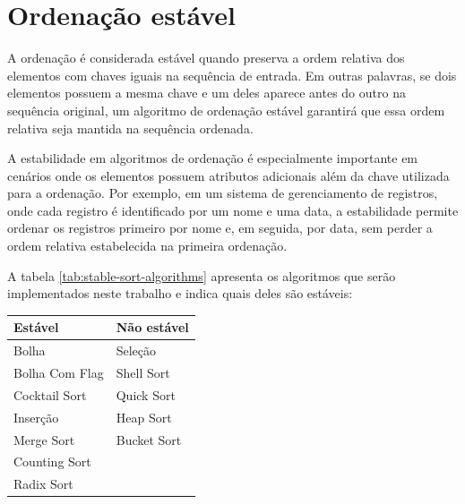 \section{Ordenação estável}
A ordenação é considerada estável quando preserva a ordem relativa dos elementos com chaves iguais na sequência de entrada. Em outras palavras, se dois elementos possuem a mesma chave e um deles aparece antes do outro na sequência original, um algoritmo de ordenação estável garantirá que essa ordem relativa seja mantida na sequência ordenada.

A estabilidade em algoritmos de ordenação é especialmente importante em cenários onde os elementos possuem atributos adicionais além da chave utilizada para a ordenação. Por exemplo, em um sistema de gerenciamento de registros, onde cada registro é identificado por um nome e uma data, a estabilidade permite ordenar os registros primeiro por nome e, em seguida, por data, sem perder a ordem relativa estabelecida na primeira ordenação.

A tabela \ref{tab:stable-sort-algorithms} apresenta os algoritmos que serão implementados neste trabalho e indica quais deles são estáveis:

\begin{table}[!h]
    \centering
    \begin{tabular}{ |p{3cm}|p{3cm}|  }
    \hline
    Estável        & Não estável \\
    \hline
    Bolha          & Seleção     \\
    Bolha Com Flag & Shell Sort  \\
    Cocktail Sort  & Quick Sort  \\
    Inserção       & Heap Sort   \\
    Merge Sort     & Bucket Sort \\
    Counting Sort  &             \\
    Radix Sort     &             \\
    \hline
    \end{tabular}
\end{table}
